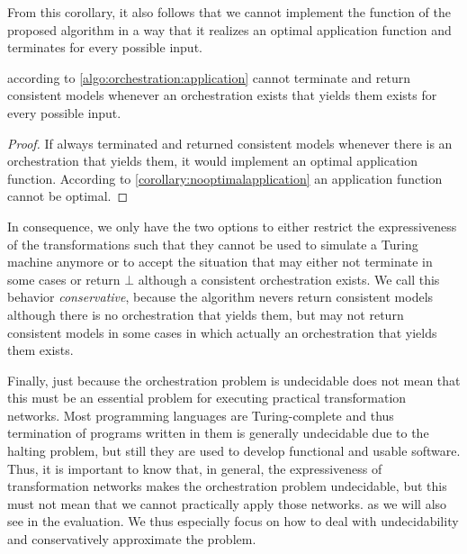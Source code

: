 From this corollary, it also follows that we cannot implement the  function of the proposed algorithm in a way that it realizes an optimal application function and terminates for every possible input.

\begin{corollary}
     according to \autoref{algo:orchestration:application} cannot terminate and return consistent models whenever an orchestration exists that yields them exists for every possible input.
\end{corollary}
\begin{proof}
    If  always terminated and returned consistent models whenever there is an orchestration that yields them, it would implement an optimal application function. %
    According to \autoref{corollary:nooptimalapplication} an application function cannot be optimal.
\end{proof}

In consequence, we only have the two options to either restrict the expressiveness of the transformations such that they cannot be used to simulate a Turing machine anymore or to accept the situation that  may either not terminate in some cases or return $\bot$ although a consistent orchestration exists.
We call this behavior \emph{conservative}, because the algorithm nevers return consistent models although there is no orchestration that yields them, but may not return consistent models in some cases in which actually an orchestration that yields them exists.

Finally, just because the orchestration problem is undecidable does not mean that this must be an essential problem for executing practical transformation networks.
Most programming languages are Turing-complete and thus termination of programs written in them is generally undecidable due to the halting problem, but still they are used to develop functional and usable software.
Thus, it is important to know that, in general, the expressiveness of transformation networks makes the orchestration problem undecidable, but this must not mean that we cannot practically apply those networks. as we will also see in the evaluation.
We thus especially focus on how to deal with undecidability and conservatively approximate the problem.

